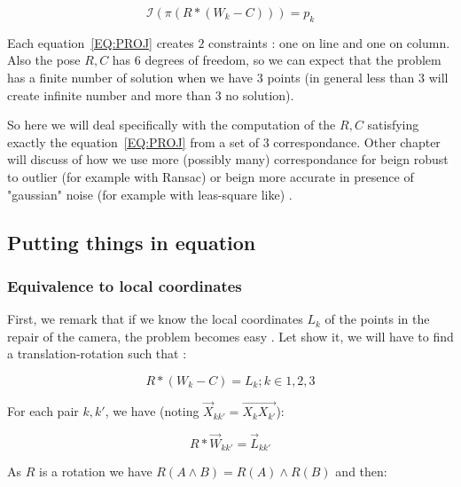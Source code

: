 \begin{equation}
       \mathcal I(\pi (R*(W_k-C))) = p_k \label{EQ:PROJ}
\end{equation}


Each equation~\ref{EQ:PROJ}  creates $2$ constraints : one on line and one on column.
Also the pose $R,C$ has $6$ degrees of freedom, so we can expect that the problem has
a finite number of solution when we have $3$ points (in general less than $3$ will create
infinite number and more than $3$ no solution).

So here we will deal specifically  with the computation of the $R,C$ satisfying
exactly the equation~\ref{EQ:PROJ}  from a set of $3$ correspondance. Other
chapter will discuss of how we use more (possibly many) correspondance for beign 
robust to outlier (for
example with Ransac) or beign more accurate in presence of "gaussian" noise (for 
example with leas-square like) .



\subsection{Putting things in equation}

\subsubsection{Equivalence to local coordinates}

\label{SpRes:EquivLocCoord}

First, we remark that if we know the local coordinates $L_k$ of the points in the repair
of the camera, the problem becomes easy . Let show it, we will have to find a translation-rotation such that  :

\begin{equation}
       R*(W_k-C) = L_k  ; k\in{1,2,3} \label{SpResecEQ:WL}
\end{equation}


For each pair $k,k'$, we have (noting $\Vec{X}_{kk'} = \overrightarrow{X_{k}X_{k'}} $):


\begin{equation}
	R* \Vec{W}_{kk'} =  \Vec{L}_{kk'} \label{SpResecEQ:WLVECT}
\end{equation}

As  $R$ is a rotation we have $R(A \wedge  B) = R(A) \wedge   R(B) $ and then:

